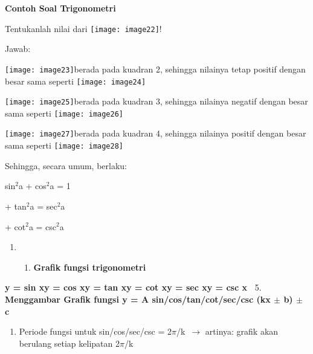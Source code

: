 \documentclass[11pt,fleqn]{book} %
\begin{document}
\noindent \textbf{Contoh Soal Trigonometri}

\noindent Tentukanlah nilai dari \texttt{[image: image22]}!

\noindent Jawab:

\noindent \texttt{[image: image23]}berada pada kuadran 2, sehingga nilainya tetap positif dengan besar sama seperti \texttt{[image: image24]}

\noindent \texttt{[image: image25]}berada pada kuadran 3, sehingga nilainya negatif dengan besar sama seperti \texttt{[image: image26]}

\noindent \texttt{[image: image27]}berada pada kuadran 4, sehingga nilainya positif dengan besar sama seperti \texttt{[image: image28]}

\noindent Sehingga, secara umum, berlaku:

\noindent sin${}^{2}$a + cos${}^{2}$a = 1

 + tan${}^{2}$a = sec${}^{2}$a

 + cot${}^{2}$a = csc${}^{2}$a

\noindent 

\noindent 

\noindent 

\noindent 

\noindent 

\noindent 

\noindent 

\noindent 

\noindent 

\begin{enumerate}
\item \begin{enumerate}
\item  \textbf{Grafik fungsi trigonometri}
\end{enumerate}
\end{enumerate}

\noindent \textbf{y = sin xy = cos xy = tan xy = cot xy = sec xy = csc x~} 5. \textbf{Menggambar Grafik fungsi y = A sin/cos/tan/cot/sec/csc (kx $\boldsymbol{\pm}$ b) $\boldsymbol{\pm}$ c}

\begin{enumerate}
\item  Periode fungsi untuk sin/cos/sec/csc = 2$\pi$/k~$\mathrm{\to}$ artinya: grafik akan berulang setiap kelipatan 2$\pi$/k
\end{enumerate}
\end{document}

